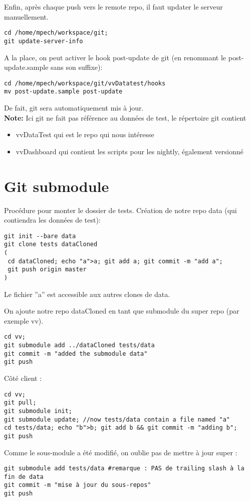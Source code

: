 \documentclass[12pt]{report}
\newenvironment{note}{\textbf{Note:}}{}
\begin{document}
Enfin, après chaque push vers le remote repo, il faut updater le serveur manuellement.
\begin{verbatim}
cd /home/mpech/workspace/git;
git update-server-info
\end{verbatim}
A la place, on peut activer le hook post-update de git (en renommant le post-update.sample sans son suffixe): 
\begin{verbatim}
cd /home/mpech/workspace/git/vvDatatest/hooks
mv post-update.sample post-update
\end{verbatim}
De fait, git sera automatiquement mis à jour.
\\
\begin{note}
 Ici git ne fait pas référence au données de test, le répertoire git contient
\begin{itemize}
\item vvDataTest qui est le repo qui nous intéresse
\item vvDashboard qui contient les scripts pour les nightly, également versionné
\end{itemize}
\end{note}

\section{Git submodule}
Procédure pour monter le dossier de tests.
Création de notre repo data (qui contiendra les données de test): 
\begin{verbatim}
git init --bare data
git clone tests dataCloned
(
 cd dataCloned; echo "a">a; git add a; git commit -m "add a";
 git push origin master
)
\end{verbatim}
Le fichier ''a'' est accessible aux autres clones de data.

On ajoute notre repo dataCloned en tant que submodule du super repo (par exemple vv).
\begin{verbatim}
cd vv;
git submodule add ../dataCloned tests/data
git commit -m "added the submodule data"
git push
\end{verbatim}

Côté client : 
\begin{verbatim}
cd vv;
git pull;
git submodule init; 
git submodule update; //now tests/data contain a file named "a"
cd tests/data; echo "b">b; git add b && git commit -m "adding b";
git push
\end{verbatim}

Comme le sous-module a été modifié, on oublie pas de mettre à jour super : 
\begin{verbatim}
git submodule add tests/data #remarque : PAS de trailing slash à la fin de data
git commit -m "mise à jour du sous-repos"
git push
\end{verbatim}
\end{document}
